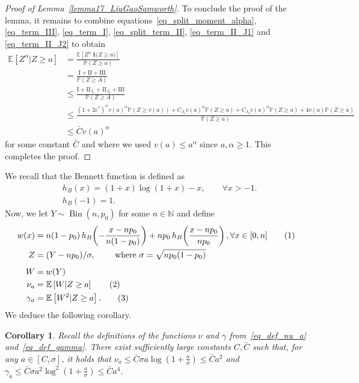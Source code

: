 \documentclass{article}
\newcommand{\one}{\mathbf{1}}
\newcommand\numberthis{\addtocounter{equation}{1}\tag{\theequation}}
\newtheorem{corollary}{Corollary}
\begin{document}
\begin{proof}[Proof of Lemma~\ref{lemma17_LiuGaoSamworth}]
To conclude the proof of the lemma, it remains to combine equations~\eqref{eq_split_moment_alpha}, \eqref{eq_term_III}, \eqref{eq_term_I}, \eqref{eq_split_term_II}, \eqref{eq_term_II_J1} and \eqref{eq_term_II_J2} to obtain
\begin{align*}
    \mathbb E\left[Z^\alpha | Z \geq a\right] &= \frac{\mathbb E\left[Z^\alpha \,\one{\big( Z \geq a\big)}\right]}{\mathbb P(Z \geq a)}\\
    & = \frac{\text{I}+\text{II}+\text{III}}{\mathbb P(Z\geq A)}\\
    & \leq \frac{\text{I}+\text{II}_{J_1} + \text{II}_{J_2} +\text{III}}{\mathbb P(Z\geq A)}\\
    & \leq \frac{(1+2c^*)^\alpha v(a)^\alpha \mathbb P \left(Z \geq v(a)\right)+ C_{J_1}v(a)^\alpha \mathbb P\left(Z \geq a\right) + C_{J_2}v(a)^\alpha \mathbb P\left(Z \geq a\right)+4 v(a) \mathbb P(Z \geq a)}{\mathbb P(Z \geq a)}\\
    & \leq \bar C v(a)^\alpha
\end{align*}
for some constant $\bar C$ and
where we used $v(a) \leq a^\alpha$ since $a,\alpha\geq 1$. 
This completes the proof.

\end{proof}

We recall that the Bennett function is defined as
\begin{align}
    &h_B(x) = (1+x) \log(1+x) - x,\qquad \forall x>-1.\label{eq_def_h_bennett}\\
    &h_B(-1) = 1.
\end{align}
Now, we let $Y \sim \operatorname{Bin}(n,p_0)$ for some $n \in \mathbb N$ and define 
\begin{align*}
    w(x) &= n(1-p_0) \, h_B\!\left(-\frac{x-np_0}{n(1-p_0)}\right) + np_0 \, h_B\!\left(\frac{x-np_0}{np_0}\right), \forall x \in [0, n]\numberthis \label{eq_def_W_appendix}\\
    Z &= (Y - np_0)/\sigma, \qquad \text{ where } \sigma = \sqrt{np_0(1-p_0)}\\[5pt]
    W &= w(Y)\\
    \nu_a &=  \mathbb 
    E\left[W| Z \geq a\right]\numberthis \label{eq_def_nu_a}\\
\gamma_a &= \mathbb E\left[W^2 | Z \geq a\right].\numberthis\label{eq_def_gamma}
\end{align*}
We deduce the following corollary.

\begin{corollary}\label{cor_lemma17_LiuGaoSamworth}
    Recall the definitions of the functions $\nu$ and $\gamma$ from~\eqref{eq_def_nu_a} and~\eqref{eq_def_gamma}. There exist sufficiently large constants $C, \bar C$ such that, for any $a \in [C, \sigma]$, it holds that $\nu_a \leq \bar C \sigma a \log\left(1+\frac{a}{\sigma}\right) \leq \bar C a^2$ and $\gamma_a \leq \bar C \sigma a^2 \log^2\left(1+\frac{a}{\sigma}\right) \leq \bar C a^4$.
\end{corollary}
\end{document}
